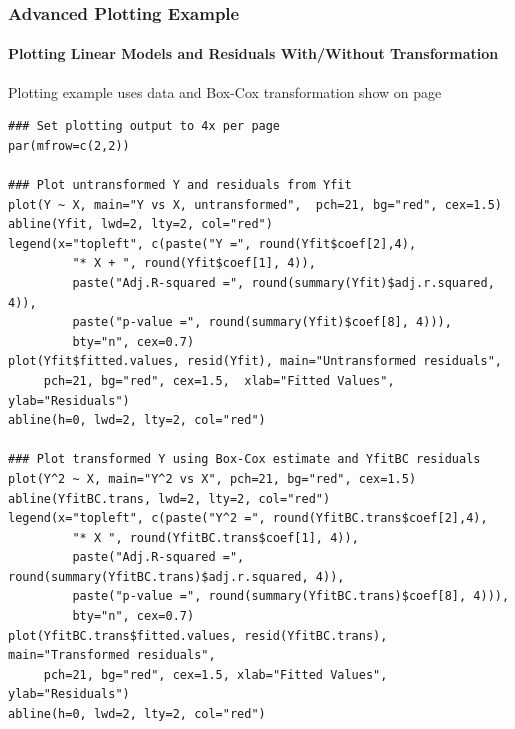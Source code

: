 \documentclass[10pt]{beamer}
\begin{document}
\begin{frame}[fragile]
\frametitle{Advanced Plotting Example}
\framesubtitle{Plotting Linear Models and Residuals With/Without Transformation}

{\scriptsize Plotting example uses data and Box-Cox transformation
  show on page \pageref{BCexample}}

{\tiny
\color{red}
\begin{verbatim}
### Set plotting output to 4x per page
par(mfrow=c(2,2))

### Plot untransformed Y and residuals from Yfit
plot(Y ~ X, main="Y vs X, untransformed",  pch=21, bg="red", cex=1.5)
abline(Yfit, lwd=2, lty=2, col="red")
legend(x="topleft", c(paste("Y =", round(Yfit$coef[2],4),
         "* X + ", round(Yfit$coef[1], 4)),
         paste("Adj.R-squared =", round(summary(Yfit)$adj.r.squared, 4)),
         paste("p-value =", round(summary(Yfit)$coef[8], 4))),
         bty="n", cex=0.7)
plot(Yfit$fitted.values, resid(Yfit), main="Untransformed residuals",
     pch=21, bg="red", cex=1.5,  xlab="Fitted Values", ylab="Residuals")
abline(h=0, lwd=2, lty=2, col="red")

### Plot transformed Y using Box-Cox estimate and YfitBC residuals
plot(Y^2 ~ X, main="Y^2 vs X", pch=21, bg="red", cex=1.5)
abline(YfitBC.trans, lwd=2, lty=2, col="red")
legend(x="topleft", c(paste("Y^2 =", round(YfitBC.trans$coef[2],4),
         "* X ", round(YfitBC.trans$coef[1], 4)),
         paste("Adj.R-squared =", round(summary(YfitBC.trans)$adj.r.squared, 4)),
         paste("p-value =", round(summary(YfitBC.trans)$coef[8], 4))),
         bty="n", cex=0.7)
plot(YfitBC.trans$fitted.values, resid(YfitBC.trans), main="Transformed residuals",
     pch=21, bg="red", cex=1.5, xlab="Fitted Values", ylab="Residuals")
abline(h=0, lwd=2, lty=2, col="red")
\end{verbatim}
}
\end{frame}
\end{document}
